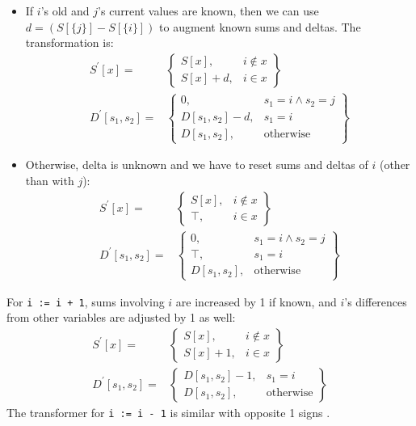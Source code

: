 \begin{itemize}
\item If $i$'s old  and $j$'s current values are known, then we can use $d = (S[\{j\}] - S[\{i\}])$ to augment known sums and deltas. The transformation is:
\begin{align*}
S^\prime[x] = & \left.
	\begin{cases}
		S[x], & i \notin x \\
		S[x] + d, & i \in x
	\end{cases}
\right\}\\
D^\prime[s_1, s_2] = & \left.
	\begin{cases}
		0, & s_1 = i \wedge s_2 = j \\
		D[s_1,s_2] - d, & s_1 = i \\
		D[s_1,s_2], & \text{otherwise}
	\end{cases}
\right\}
\end{align*}
\item Otherwise, delta is unknown and we have to reset sums and deltas of $i$ (other than with $j$):
\begin{align*}
S^\prime[x] = & \left.
	\begin{cases}
		S[x], & i \notin x \\
		\top, & i \in x
	\end{cases}
\right\}\\
D^\prime[s_1, s_2] = & \left.
	\begin{cases}
		0, & s_1 = i \wedge s_2 = j \\
		\top, & s_1 = i \\
		D[s_1,s_2], & \text{otherwise}
	\end{cases}
\right\}
\end{align*}
\end{itemize}

For \texttt{i := i + 1}, sums involving $i$ are increased by 1 if known, and $i$'s differences from other variables are adjusted by 1 as well:
\begin{align*}
S^\prime[x] = & \left.
	\begin{cases}
		S[x], & i \notin x \\
		S[x] + 1, & i \in x
	\end{cases}
\right\}\\
D^\prime[s_1, s_2] = & \left.
	\begin{cases}
		D[s_1,s_2] - 1, & s_1 = i \\
		D[s_1,s_2], & \text{otherwise}
	\end{cases}
\right\}
\end{align*}
The transformer for \texttt{i := i - 1} is similar with opposite 1 signs .

